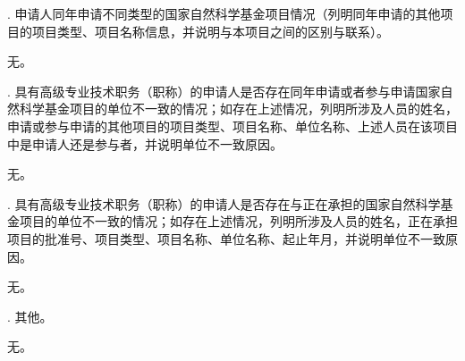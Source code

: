 \documentclass[12pt,UTF8,AutoFakeBold=2,a4paper]{ctexart} %
\newcommand{\sihao}{\fontsize{14pt}{\baselineskip}\selectfont}
\begin{document}
{\sihao \color{MsBlue} . 申请人同年申请不同类型的国家自然科学基金项目情况（列明同年申请的其他项目的项目类型、项目名称信息，并说明与本项目之间的区别与联系）。 }

无。

{\sihao \color{MsBlue} . 具有高级专业技术职务（职称）的申请人是否存在同年申请或者参与申请国家自然科学基金项目的单位不一致的情况；如存在上述情况，列明所涉及人员的姓名，申请或参与申请的其他项目的项目类型、项目名称、单位名称、上述人员在该项目中是申请人还是参与者，并说明单位不一致原因。}

无。

{\sihao \color{MsBlue} . 具有高级专业技术职务（职称）的申请人是否存在与正在承担的国家自然科学基金项目的单位不一致的情况；如存在上述情况，列明所涉及人员的姓名，正在承担项目的批准号、项目类型、项目名称、单位名称、起止年月，并说明单位不一致原因。}

无。

{\sihao \color{MsBlue} . 其他。}

无。
\end{document}
